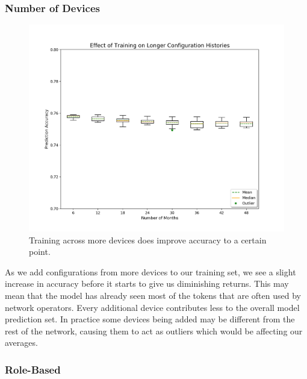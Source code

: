 \subsubsection{Number of Devices}
\begin{figure}[H]
	\centering
	\includegraphics[width=\textwidth]{time.png}
	\caption{Training across more devices does improve accuracy to a certain point.}
\end{figure}

As we add configurations from more devices to our training set, we see a slight increase in accuracy before it starts to give us diminishing returns. This may mean that the model has already seen most of the tokens that are often used by network operators. Every additional device contributes less to the overall model prediction set. In practice some devices being added may be different from the rest of the network, causing them to act as outliers which would be affecting our averages.

\subsubsection{Role-Based}

